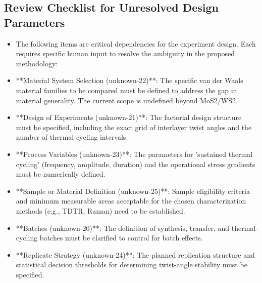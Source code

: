 \documentclass[conference]{IEEEtran}
\begin{document}
\subsection{Review Checklist for Unresolved Design Parameters}
\begin{itemize}
\item The following items are critical dependencies for the experiment design. Each requires specific human input to resolve the ambiguity in the proposed methodology:
\item **Material System Selection (unknown-22)**: The specific van der Waals material families to be compared must be defined to address the gap in material generality. The current scope is undefined beyond MoS2/WS2.
\item **Design of Experiments (unknown-21)**: The factorial design structure must be specified, including the exact grid of interlayer twist angles and the number of thermal-cycling intervals.
\item **Process Variables (unknown-23)**: The parameters for 'sustained thermal cycling' (frequency, amplitude, duration) and the operational stress gradients must be numerically defined.
\item **Sample or Material Definition (unknown-25)**: Sample eligibility criteria and minimum measurable areas acceptable for the chosen characterization methods (e.g., TDTR, Raman) need to be established.
\item **Batches (unknown-20)**: The definition of synthesis, transfer, and thermal-cycling batches must be clarified to control for batch effects.
\item **Replicate Strategy (unknown-24)**: The planned replication structure and statistical decision thresholds for determining twist-angle stability must be specified.
\end{itemize}
\end{document}
